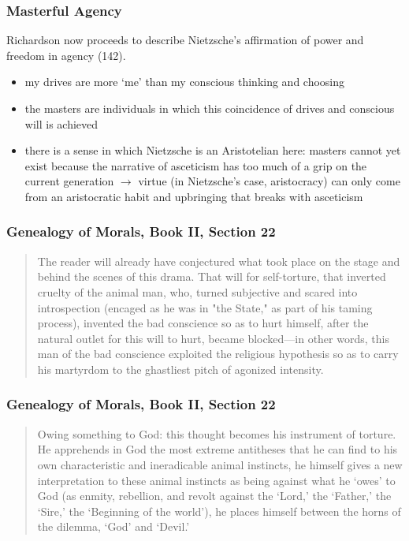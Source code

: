 \documentclass[xcolor=dvipsnames]{beamer}
\begin{document}
\begin{frame}
  \frametitle{Masterful Agency}
  Richardson now proceeds to describe Nietzsche's affirmation of power
  and freedom in agency (142).
  \begin{itemize}
  \item my drives are more `me' than my conscious thinking and
    choosing
  \item the masters are individuals in which this coincidence of
    drives and conscious will is achieved
  \item there is a sense in which Nietzsche is an Aristotelian here:
    masters cannot yet exist because the narrative of asceticism has
    too much of a grip on the current generation $\longrightarrow$
    virtue (in Nietzsche's case, aristocracy) can only come from an
    aristocratic habit and upbringing that breaks with asceticism
  \end{itemize}
\end{frame}

\begin{frame}
  \frametitle{Genealogy of Morals, Book II, Section 22}
  \begin{quote}
    The reader will already have conjectured what took place on the
    stage and behind the scenes of this drama. That will for
    self-torture, that inverted cruelty of the animal man, who, turned
    subjective and scared into introspection (encaged as he was in
    "the State," as part of his taming process), invented the bad
    conscience so as to hurt himself, after the natural outlet for
    this will to hurt, became blocked---in other words, this man of
    the bad conscience exploited the religious hypothesis so as to
    carry his martyrdom to the ghastliest pitch of agonized intensity.
  \end{quote}
\end{frame}

\begin{frame}
  \frametitle{Genealogy of Morals, Book II, Section 22}
  \begin{quote}
    Owing something to God: this thought becomes his instrument of
    torture. He apprehends in God the most extreme antitheses that he
    can find to his own characteristic and ineradicable animal
    instincts, he himself gives a new interpretation to these animal
    instincts as being against what he `owes' to God (as enmity,
    rebellion, and revolt against the `Lord,' the `Father,' the
    `Sire,' the `Beginning of the world'), he places himself between
    the horns of the dilemma, `God' and `Devil.'
  \end{quote}
\end{frame}
\end{document}
